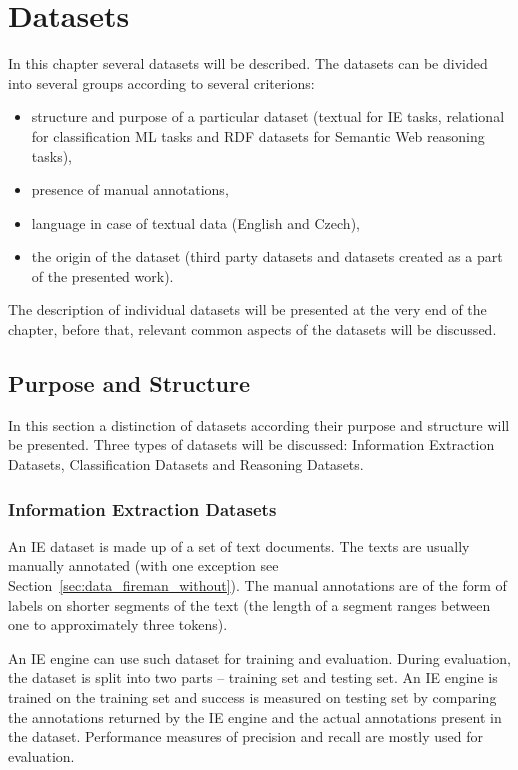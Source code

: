 \chapter{Datasets} \label{sec:ch_data}

\graphicspath{{../img/ch40/}}



In this chapter several datasets will be described. The datasets can be divided into several groups according to several criterions: 
\begin{itemize}
	\item structure and purpose of a particular dataset (textual for IE tasks, relational for classification ML tasks and RDF datasets for Semantic Web reasoning tasks), 
	\item presence of manual annotations,
	\item language in case of textual data (English and Czech), 
	\item the origin of the dataset (third party datasets and datasets created as a part of the presented work).
\end{itemize}
The description of individual datasets will be presented at the very end of the chapter, before that, relevant common aspects of the datasets will be discussed.


\section{Purpose and Structure}
In this section a distinction of datasets according their purpose and structure will be presented. Three types of datasets will be discussed: Information Extraction Datasets, Classification Datasets and Reasoning Datasets.

\subsection{Information Extraction Datasets}
An IE dataset is made up of a set of text documents. The texts are usually manually annotated (with one exception see Section~\ref{sec:data_fireman_without}). The manual annotations are of the form of labels on shorter segments of the text (the length of a segment ranges between one to approximately three tokens). 

An IE engine can use such dataset for training and evaluation. During evaluation, the dataset is split into two parts -- training set and testing set. An IE engine is trained on the training set and success is measured on testing set by comparing the annotations returned by the IE engine and the actual annotations present in the dataset.
Performance measures of precision and recall are mostly used for evaluation. 

